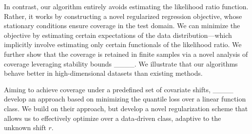 In contrast, our algorithm entirely avoids estimating the likelihood ratio function. Rather, it works by constructing a novel regularized regression objective, whose stationary conditions ensure coverage in the test domain.
We can minimize the objective by estimating certain expectations of the data distribution---which implicitly involve estimating only certain functionals of the likelihood ratio.
We further show that the coverage is retained in finite samples via a novel analysis of coverage leveraging stability bounds 
____. We illustrate that our algorithms behave better in high-dimensional datasets than existing methods.

Aiming to achieve coverage under a predefined set of covariate shifts,
____ develop an approach based on minimizing the quantile loss over a linear function class.
We build on their approach, but develop a novel regularization scheme that 
allows us to 
effectively optimize over a data-driven class,
adaptive to the unknown shift $r$.
